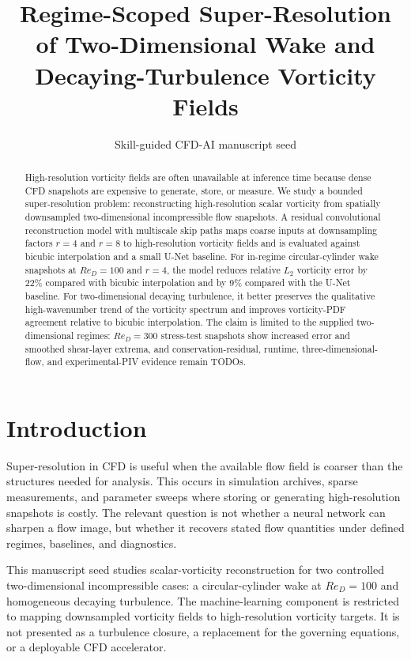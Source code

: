 \documentclass[11pt]{article}
\title{Regime-Scoped Super-Resolution of Two-Dimensional Wake and Decaying-Turbulence Vorticity Fields}
\author{Skill-guided CFD-AI manuscript seed}
\date{}
\begin{document}
\maketitle
\begin{abstract}
High-resolution vorticity fields are often unavailable at inference time because dense CFD snapshots are expensive to generate, store, or measure. We study a bounded super-resolution problem: reconstructing high-resolution scalar vorticity from spatially downsampled two-dimensional incompressible flow snapshots. A residual convolutional reconstruction model with multiscale skip paths maps coarse inputs at downsampling factors $r=4$ and $r=8$ to high-resolution vorticity fields and is evaluated against bicubic interpolation and a small U-Net baseline. For in-regime circular-cylinder wake snapshots at $Re_D=100$ and $r=4$, the model reduces relative $L_2$ vorticity error by 22\% compared with bicubic interpolation and by 9\% compared with the U-Net baseline. For two-dimensional decaying turbulence, it better preserves the qualitative high-wavenumber trend of the vorticity spectrum and improves vorticity-PDF agreement relative to bicubic interpolation. The claim is limited to the supplied two-dimensional regimes: $Re_D=300$ stress-test snapshots show increased error and smoothed shear-layer extrema, and conservation-residual, runtime, three-dimensional-flow, and experimental-PIV evidence remain TODOs.
\end{abstract}

\section{Introduction}
Super-resolution in CFD is useful when the available flow field is coarser than the structures needed for analysis. This occurs in simulation archives, sparse measurements, and parameter sweeps where storing or generating high-resolution snapshots is costly. The relevant question is not whether a neural network can sharpen a flow image, but whether it recovers stated flow quantities under defined regimes, baselines, and diagnostics.

This manuscript seed studies scalar-vorticity reconstruction for two controlled two-dimensional incompressible cases: a circular-cylinder wake at $Re_D=100$ and homogeneous decaying turbulence. The machine-learning component is restricted to mapping downsampled vorticity fields to high-resolution vorticity targets. It is not presented as a turbulence closure, a replacement for the governing equations, or a deployable CFD accelerator.
\end{document}
